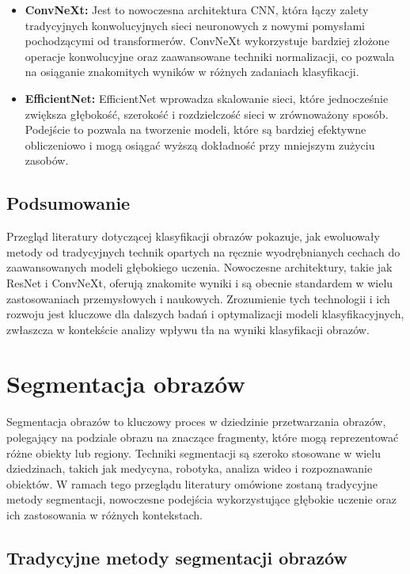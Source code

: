 \begin{itemize}
    \item \textbf{ConvNeXt:} Jest to nowoczesna architektura CNN, która łączy zalety tradycyjnych 
    konwolucyjnych sieci neuronowych z nowymi pomysłami pochodzącymi od transformerów. 
    ConvNeXt wykorzystuje bardziej złożone operacje konwolucyjne oraz zaawansowane techniki 
    normalizacji, co pozwala na osiąganie znakomitych wyników w różnych zadaniach klasyfikacji. \cite{convnext}
    \item \textbf{EfficientNet:}  EfficientNet wprowadza skalowanie sieci, które jednocześnie 
    zwiększa głębokość, szerokość i rozdzielczość sieci w zrównoważony sposób. Podejście to 
    pozwala na tworzenie modeli, które są bardziej efektywne obliczeniowo i mogą osiągać wyższą 
    dokładność przy mniejszym zużyciu zasobów. \cite{Efficientnet}
\end{itemize}

\subsection*{Podsumowanie}
Przegląd literatury dotyczącej klasyfikacji obrazów pokazuje, jak ewoluowały metody od 
tradycyjnych technik opartych na ręcznie wyodrębnianych cechach do zaawansowanych modeli 
głębokiego uczenia. Nowoczesne architektury, takie jak ResNet i ConvNeXt, oferują znakomite 
wyniki i są obecnie standardem w wielu zastosowaniach przemysłowych i naukowych. Zrozumienie 
tych technologii i ich rozwoju jest kluczowe dla dalszych badań i optymalizacji modeli 
klasyfikacyjnych, zwłaszcza w kontekście analizy wpływu tła na wyniki klasyfikacji obrazów.

\section*{Segmentacja obrazów}

Segmentacja obrazów to kluczowy proces w dziedzinie przetwarzania obrazów,
polegający na podziale obrazu na znaczące fragmenty, które mogą reprezentować 
różne obiekty lub regiony. Techniki segmentacji są szeroko stosowane w wielu dziedzinach,
takich jak medycyna, robotyka, analiza wideo i rozpoznawanie obiektów. W ramach tego przeglądu 
literatury omówione zostaną tradycyjne metody segmentacji, nowoczesne podejścia wykorzystujące 
głębokie uczenie oraz ich zastosowania w różnych kontekstach. \cite{seg_tec}

\subsection*{Tradycyjne metody segmentacji obrazów}

